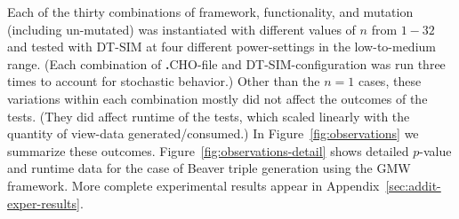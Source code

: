 \documentclass[acmlarge, manuscript, screen, review, anonymous, table]{acmart}
\newcommand{\langname}{\textsc{\textbf{.}CHO}\xspace}
\newcommand{\toolname}{\textsc{DT-SIM}\xspace}
\begin{document}
Each of the thirty combinations of framework, functionality, and mutation (including un-mutated)
was instantiated with different values of $n$ from $1-32$ and tested with \toolname at four different power-settings in the low-to-medium range.
(Each combination of \langname-file and \toolname-configuration was run three times to account for stochastic behavior.)
Other than the $n=1$ cases, these variations within each combination mostly did not affect the outcomes of the tests.
(They did affect runtime of the tests, which scaled linearly with the quantity of view-data generated/consumed.)
In Figure~\ref{fig:observations} we summarize these outcomes.
Figure~\ref{fig:observations-detail} shows detailed $p$-value and runtime data for the case of Beaver triple generation using the GMW framework.
More complete experimental results appear in Appendix~\ref{sec:addit-exper-results}.
\end{document}
